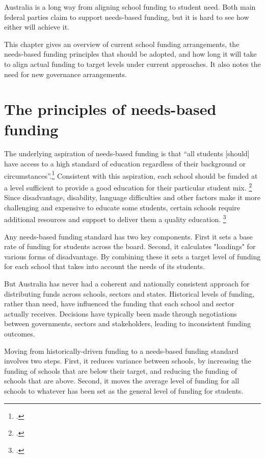 \documentclass{grattan}
\begin{document}
Australia is a long way from aligning school funding to student need.
Both main federal parties claim to support needs-based funding, but it is hard to see how either will achieve it.

This chapter gives an overview of current school funding arrangements, the needs-based funding principles that should be adopted, and how long it will take to align actual funding to target levels under current approaches. It also notes the need for new governance arrangements.

\section{The principles of needs-based funding}\label{sec:the-principles-of-needs-based-funding}

The underlying aspiration of needs-based funding is that ``all students [should] have access to a high standard of education regardless of their background or circumstances''.\footcite[][xxxi]{Gonski2011ReviewFundingSchooling}
Consistent with this aspiration, each school should be funded at a level sufficient to provide a good education for their particular student mix.%
\footcite[][xxi]{Gonski2011ReviewFundingSchooling}
Since disadvantage, disability, language difficulties and other factors make it more challenging and expensive to educate some students, certain schools require additional resources and support to deliver them a quality education.
\footcite[][xxi]{Gonski2011ReviewFundingSchooling}

Any needs-based funding standard has two key components. First it sets a base rate of funding for students across the board.  Second, it calculates "loadings" for various forms of disadvantage. By combining these it sets a target level of funding for each school that takes into account the needs of its students.

But Australia has never had a coherent and nationally consistent approach for distributing funds across schools, sectors and states.
Historical levels of funding, rather than need, have influenced the funding that each school and sector actually receives. Decisions have typically been made through negotiations between governments, sectors and stakeholders, leading to inconsistent funding outcomes.

Moving from historically-driven funding to a needs-based funding standard involves two steps.
First, it reduces variance between schools, by increasing the funding of schools that are below their target, and reducing the funding of schools that are above.
Second, it moves the average level of funding for all schools to whatever has been set as the general level of funding for students.
\end{document}
